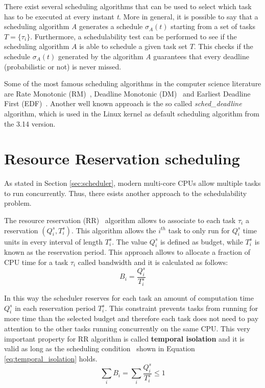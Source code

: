 There exist several scheduling algorithms that can be used to select which task 
has to be executed at every instant \emph{t}. More in general, it is
possible to say that a scheduling algorithm \emph{A} generates a schedule
\( \sigma_{A}\left(t\right) \) starting from a set of tasks \( T = \{\tau_{i}\} \).
Furthermore, a schedulability test can be performed to see if the scheduling
algorithm \( A \) is able to schedule a given task set \( T \). This checks
if the schedule \( \sigma_{A}\left(t\right) \) generated by the algorithm \emph{A}
guarantees that every deadline (probabilistic or not) is never missed.

Some of the most famous scheduling algorithms in the computer science literature
are Rate Monotonic (RM)~\cite{lehoczky1989rate}, Deadline Monotonic
(DM)~\cite{audsley1991hard} and Earliest Deadline First (EDF)~\cite{jansen2003lightweight}.
Another well known approach is the so called \emph{sched\_deadline}~\cite{lelli2016deadline}
algorithm, which is used in the Linux kernel as default scheduling algorithm from
the 3.14 version.


\section{Resource Reservation scheduling}
As stated in Section \ref{sec:scheduler}, modern multi-core CPUs allow multiple
tasks to run concurrently. Thus, there esists another approach to the schedulability
problem.

The resource reservation (RR)~\cite{abeni1998integrating} algorithm allows to associate to each task 
\( \tau_{i} \) a reservation \( \left(Q_{i}^s, T_{i}^s\right) \). 
This algorithm allows the \( i^{th} \) task to only run for \( Q_{i}^s \) time units 
in every interval of length \( T_{i}^s \). The value \( Q_{i}^s \) is defined as
budget, while \( T_{i}^s \) is known as the reservation period.
This approach allows to allocate a fraction of CPU time for a task \( \tau_{i} \)
called bandwidth and it is calculated as follows:
\begin{equation}
    B_{i} = \frac{Q_{i}^s}{T_{i}^s}
\end{equation}

In this way the scheduler reserves for each task an amount of computation
time \( Q_{i}^s \) in each reservation period \( T_{i}^s \). This constraint
prevents tasks from running for more time than the selected budget and
therefore each task does not need to pay attention to the other tasks running
concurrently on the same CPU. This very important property for RR algorithm is called
\textbf{temporal isolation} and it is valid as long as the scheduling
condition~\cite{lee2007handbook} shown in Equation \ref{eq:temporal_isolation} 
holds.
\begin{equation} \label{eq:temporal_isolation}
    \displaystyle\sum_{i} B_{i} =  \displaystyle\sum_{i} \frac{Q_{i}^s}{T_{i}^s} \leq 1
\end{equation}

